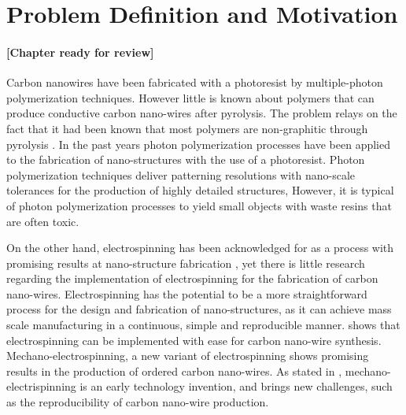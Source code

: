 
\chapter{Problem Definition and Motivation} %

\label{Chapter:ProblemDefinitionandMotivation}

\subsubsection*{\color{mygray}[Chapter ready for review]}

Carbon nanowires have been fabricated with a photoresist by multiple-photon polymerization techniques. However little is known about polymers that can produce conductive carbon nano-wires after pyrolysis. The problem relays on the fact that it had been known that most polymers are non-graphitic through pyrolysis \cite{Franklin1951}. In the past years photon polymerization processes have been applied to the fabrication of nano-structures with the use of a photoresist. \cite{Boer2014} Photon polymerization techniques deliver patterning resolutions with nano-scale tolerances for the production of highly detailed structures, \cite{Hribar2014} However, it is typical of photon polymerization processes to yield small objects with waste resins that are often toxic. \cite{Ovsianikov2012}

On the other hand, electrospinning has been acknowledged for as a process with promising results at nano-structure fabrication \cite{Boer2014}, yet there is little research regarding the implementation of electrospinning for the fabrication of carbon nano-wires. Electrospinning has the potential to be a more straightforward process for the design and fabrication of nano-structures, as it can achieve mass scale manufacturing in a continuous, simple and reproducible manner. \cite{Cardenas2017} shows that electrospinning can be implemented with ease for carbon nano-wire synthesis. Mechano-electrospinning, a new variant of electrospinning shows promising results in the production of ordered carbon nano-wires. As stated in \cite{Cardenas2017}, mechano-electrispinning is an early technology invention, and brings new challenges, such as the reproducibility of carbon nano-wire production.


